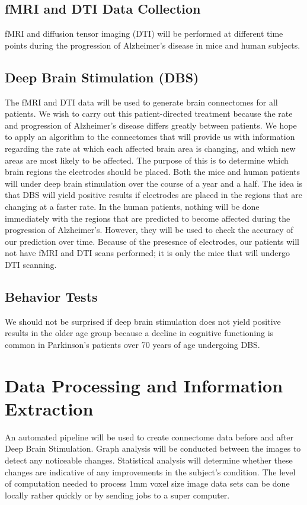 \documentclass{article}
\begin{document}
\subsection{fMRI and DTI Data Collection}
fMRI and diffusion tensor imaging (DTI) will be performed at different time points during the progression of Alzheimer's disease in mice and human subjects.

\subsection{Deep Brain Stimulation (DBS)}
The fMRI and DTI data will be used to generate brain connectomes for all patients. We wish to carry out this patient-directed treatment because the rate and progression of Alzheimer's disease differs greatly between patients. We hope to apply an algorithm to the connectomes that will provide us with information regarding the rate at which each affected brain area is changing, and which new areas are most likely to be affected. The purpose of this is to determine which brain regions the electrodes should be placed. Both the mice and human patients will under deep brain stimulation over the course of a year and a half. The idea is that DBS will yield positive results if electrodes are placed in the regions that are changing at a faster rate. In the human patients, nothing will be done immediately with the regions that are predicted to become affected during the progression of Alzheimer's. However, they will be used to check the accuracy of our prediction over time. Because of the presesnce of electrodes, our patients will not have fMRI and DTI scans performed; it is only the mice that will undergo DTI scanning.

\subsection{Behavior Tests}

We should not be surprised if deep brain stimulation does not yield positive results in the older age group because a decline in cognitive functioning is common in Parkinson's patients over 70 years of age undergoing DBS.

\section{Data Processing and Information Extraction}
An automated pipeline will be used to create connectome data before and after Deep Brain Stimulation. \cite{Pipeline} Graph analysis will be conducted between the images to detect any noticeable changes. Statistical analysis will determine whether these changes are indicative of any improvements in the subject's condition. The level of computation needed to process 1mm voxel size image data sets can be done locally rather quickly or by sending jobs to a super computer.
\end{document}
